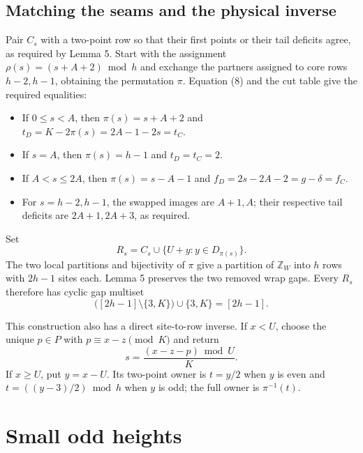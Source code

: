 \documentclass[11pt,a4paper]{article}
\providecommand{\tightlist}{\setlength{\itemsep}{0pt}\setlength{\parskip}{0pt}}
\begin{document}
\hypertarget{matching-the-seams-and-the-physical-inverse}{%
\subsection{Matching the seams and the physical inverse}\label{matching-the-seams-and-the-physical-inverse}}

Pair \(C_s\) with a two-point row so that their first points or their tail deficits agree, as required by Lemma 5. Start with the assignment \(\rho(s)=(s+A+2)\bmod h\) and exchange the partners assigned to core rows \(h-2,h-1\), obtaining the permutation \(\pi\). Equation (8) and the cut table give the required equalities:

\begin{itemize}
\tightlist
\item
  If \(0\leq s<A\), then \(\pi(s)=s+A+2\) and \(t_D=K-2\pi(s)=2A-1-2s=t_C\).
\item
  If \(s=A\), then \(\pi(s)=h-1\) and \(t_D=t_C=2\).
\item
  If \(A<s\leq2A\), then \(\pi(s)=s-A-1\) and \(f_D=2s-2A-2=g-\delta=f_C\).
\item
  For \(s=h-2,h-1\), the swapped images are \(A+1,A\); their respective tail deficits are \(2A+1,2A+3\), as required.
\end{itemize}

Set \begin{equation}
R_s=C_s\cup\{U+y:y\in D_{\pi(s)}\}.
\tag{12}\label{eq:12}
\end{equation} The two local partitions and bijectivity of \(\pi\) give a partition of \(\mathbb Z_W\) into \(h\) rows with \(2h-1\) sites each. Lemma 5 preserves the two removed wrap gaps. Every \(R_s\) therefore has cyclic gap multiset \[
 \bigl([2h-1]\setminus\{3,K\}\bigr)\cup\{3,K\}=[2h-1].
\]

This construction also has a direct site-to-row inverse. If \(x<U\), choose the unique \(p\in P\) with \(p\equiv x-z\pmod K\) and return \begin{equation}
s=\frac{(x-z-p)\bmod U}{K}.
\tag{13}\label{eq:13}
\end{equation} If \(x\geq U\), put \(y=x-U\). Its two-point owner is \(t=y/2\) when \(y\) is even and \(t=((y-3)/2)\bmod h\) when \(y\) is odd; the full owner is \(\pi^{-1}(t)\).

\hypertarget{small-odd-heights}{%
\section{Small odd heights}\label{small-odd-heights}}
\end{document}
